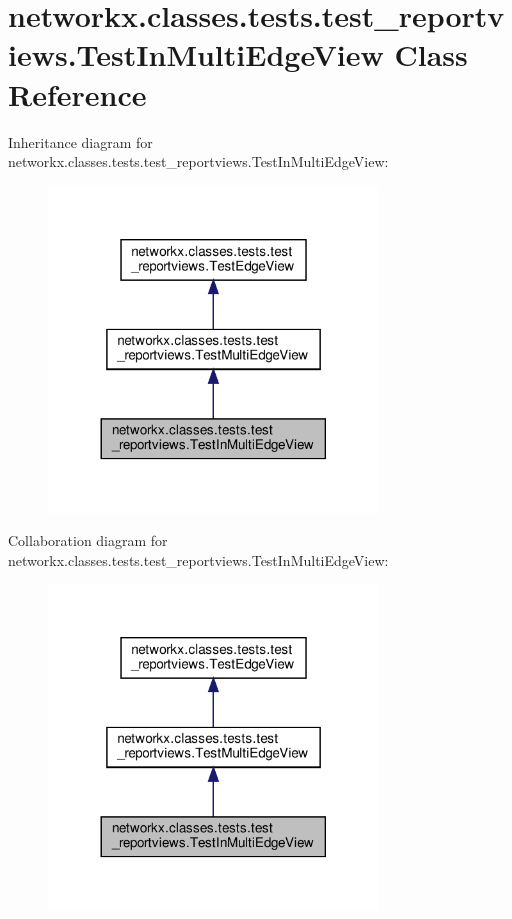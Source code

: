 \hypertarget{classnetworkx_1_1classes_1_1tests_1_1test__reportviews_1_1TestInMultiEdgeView}{}\section{networkx.\+classes.\+tests.\+test\+\_\+reportviews.\+Test\+In\+Multi\+Edge\+View Class Reference}
\label{classnetworkx_1_1classes_1_1tests_1_1test__reportviews_1_1TestInMultiEdgeView}


Inheritance diagram for networkx.\+classes.\+tests.\+test\+\_\+reportviews.\+Test\+In\+Multi\+Edge\+View\+:
\nopagebreak
\begin{figure}[H]
\begin{center}
\leavevmode
\includegraphics[width=248pt]{classnetworkx_1_1classes_1_1tests_1_1test__reportviews_1_1TestInMultiEdgeView__inherit__graph}
\end{center}
\end{figure}


Collaboration diagram for networkx.\+classes.\+tests.\+test\+\_\+reportviews.\+Test\+In\+Multi\+Edge\+View\+:
\nopagebreak
\begin{figure}[H]
\begin{center}
\leavevmode
\includegraphics[width=248pt]{classnetworkx_1_1classes_1_1tests_1_1test__reportviews_1_1TestInMultiEdgeView__coll__graph}
\end{center}
\end{figure}
